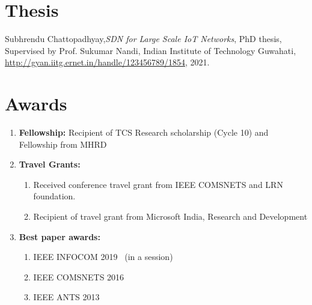 \documentclass{article}
\begin{document}
\section{Thesis}
Subhrendu Chattopadhyay,{\em SDN for Large Scale IoT Networks}, PhD thesis, Supervised by Prof. Sukumar Nandi, Indian Institute of Technology Guwahati, \url{http://gyan.iitg.ernet.in/handle/123456789/1854}, 2021.
\section{Awards}
	\begin{enumerate}
		\item{\bf Fellowship:} Recipient of TCS Research scholarship (Cycle 10) and Fellowship from MHRD
		\item {\bf Travel Grants:} 
			\begin{enumerate}
				\item Received conference travel grant from IEEE COMSNETS and LRN foundation.
				\item Recipient of travel grant from Microsoft India, Research and Development
			\end{enumerate}
		\item {\bf Best paper awards:} 
			\begin{enumerate}
				\item IEEE INFOCOM 2019~\cite{chattopadhyay2018aloe} (in a session)
				\item IEEE COMSNETS 2016~\cite{chakraborty2016es2}
				\item IEEE ANTS 2013~\cite{chakraborty2013surpassing}
			\end{enumerate}
	\end{enumerate}
\end{document}
